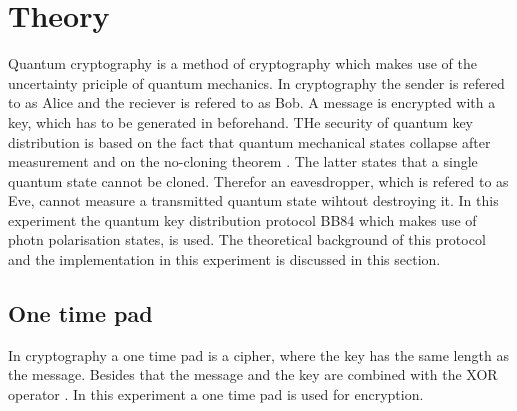 \section{Theory} \label{sec:theory}
Quantum cryptography is a method of cryptography which makes use of the uncertainty priciple of quantum mechanics.
In cryptography the sender is refered to as Alice and the reciever is refered to as Bob. %
A message is encrypted with a key, which has to be generated in beforehand. 
THe security of quantum key distribution is based on the fact that quantum mechanical states collapse after measurement and on the no-cloning theorem \cite{riggs_2022}.
The latter states that a single quantum state cannot be cloned. 
Therefor an eavesdropper, which is refered to as Eve, cannot measure a transmitted quantum state wihtout destroying it. 
In this experiment the quantum key distribution protocol BB84 which makes use of photn polarisation states, is used. 
The theoretical background of this protocol and the implementation in this experiment is discussed in this section. 

\subsection{One time pad}
In cryptography a one time pad is a cipher, where the key has the same length as the message. 
Besides that the message and the key are combined with the XOR operator \cite{lugrin_2023}.  
In this experiment a one time pad is used for encryption.

